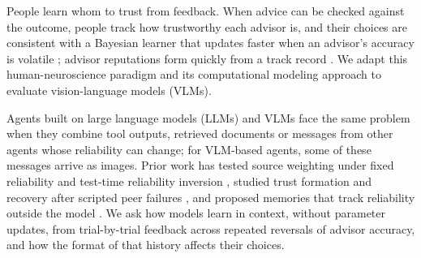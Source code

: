 People learn whom to trust from feedback. When advice can be checked against the outcome, people track how trustworthy each advisor is, and their choices are consistent with a Bayesian learner that updates faster when an advisor's accuracy is volatile \citep{behrens2008associative}; advisor reputations form quickly from a track record \citep{yaniv2000advice,bonaccio2006advice}. We adapt this human-neuroscience paradigm and its computational modeling approach to evaluate vision-language models (VLMs).

Agents built on large language models (LLMs) and VLMs face the same problem when they combine tool outputs, retrieved documents or messages from other agents whose reliability can change; for VLM-based agents, some of these messages arrive as images. Prior work has tested source weighting under fixed reliability \citep{ashkinaze2026information} and test-time reliability inversion \citep{zhou2026epistemic}, studied trust formation and recovery after scripted peer failures \citep{chen2026trust}, and proposed memories that track reliability outside the model \citep{feng2026sigmamem}. We ask how models learn in context, without parameter updates, from trial-by-trial feedback across repeated reversals of advisor accuracy, and how the format of that history affects their choices.

